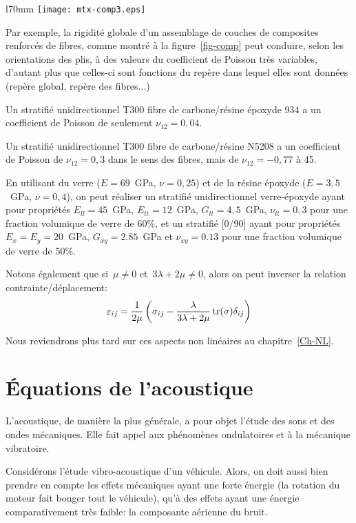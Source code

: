 \medskip
\begin{wrapfigure}{l}{70mm}
  \centering
  \texttt{[image: mtx-comp3.eps]}
  \caption{Matériau composite}\label{fig-comp}
\end{wrapfigure}
Par exemple, la rigidité globale d'un assemblage de couches de composites renforcés de fibres, comme montré à la figure~\ref{fig-comp} peut conduire, selon les orientations des plis, à des valeurs du coefficient de Poisson très variables, d'autant plus que celles-ci sont fonctions du repère dans lequel elles sont données (repère global, repère des fibres...)

Un stratifié unidirectionnel T300 fibre de carbone/résine époxyde 934 a un coefficient de Poisson de seulement $\nu_{12}=0,04$.

Un stratifié unidirectionnel T300 fibre de carbone/résine N5208 a un coefficient de Poisson de $\nu_{12}=0,3$ dans le sens des fibres, mais de $\nu_{12}=-0,77$ à 45\degres.

En utilisant du verre ($E=69$~GPa, $\nu=0,25$) et de la résine époxyde ($E=3,5$~GPa, $\nu=0,4$), on peut réaliser un stratifié unidirectionnel verre-époxyde ayant pour propriétés $E_{ll}=45$~GPa, $E_{tt}=12$~GPa, $G_{lt}=4,5$~GPa, $\nu_{lt}=0,3$ pour une fraction volumique de verre de 60\%, et un stratifié [0/90] ayant pour propriétés $E_x=E_y=20$~GPa, $G_{xy}=2.85$~GPa et $\nu_{xy}=0.13$ pour une fraction volumique de verre de 50\%.


\medskip
Notons également que si~$\mu\ne0$ et~$3\lambda+2\mu\ne0$, alors on peut inverser la
relation contrainte/dé\-pla\-ce\-ment:
\begin{equation}
\varepsilon_{ij}=\dfrac1{2\mu}\left(\sigma_{ij}-\dfrac\lambda{3\lambda+2\mu}\operatorname{tr}(\sigma)\delta_{ij}\right)
\end{equation}

\medskip
Nous reviendrons plus tard sur ces aspects non linéaires au chapitre~\ref{Ch-NL}.


\medskip
\section{Équations de l'acoustique}\label{Sec-EqAcou}
L'acoustique, de manière la plus générale, a pour objet l'étude des sons et des ondes mécaniques.  Elle fait appel aux phénomènes ondulatoires et à la mécanique vibratoire.

Considérons l'étude vibro-acoustique d'un véhicule. Alors, on doit aussi bien prendre en compte les effets mécaniques ayant une forte énergie (la rotation du moteur fait bouger tout le véhicule), qu'à des effets ayant une énergie comparativement très faible: la composante aérienne du bruit. 

